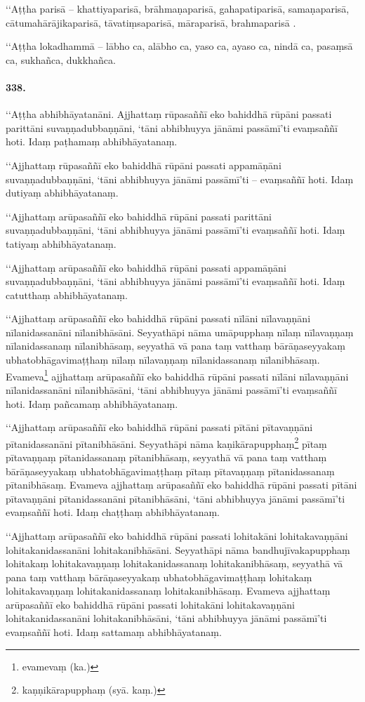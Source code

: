 ‘‘Aṭṭha parisā – khattiyaparisā, brāhmaṇaparisā, gahapatiparisā, samaṇaparisā, cātumahārājikaparisā, tāvatiṃsaparisā, māraparisā, brahmaparisā .

‘‘Aṭṭha lokadhammā – lābho ca, alābho ca, yaso ca, ayaso ca, nindā ca, pasaṃsā ca, sukhañca, dukkhañca.

\paragraph{338.} ‘‘Aṭṭha abhibhāyatanāni. Ajjhattaṃ rūpasaññī eko bahiddhā rūpāni passati parittāni suvaṇṇadubbaṇṇāni, ‘tāni abhibhuyya jānāmi passāmī’ti evaṃsaññī hoti. Idaṃ paṭhamaṃ abhibhāyatanaṃ.

‘‘Ajjhattaṃ rūpasaññī eko bahiddhā rūpāni passati appamāṇāni suvaṇṇadubbaṇṇāni, ‘tāni abhibhuyya jānāmi passāmī’ti – evaṃsaññī hoti. Idaṃ dutiyaṃ abhibhāyatanaṃ.

‘‘Ajjhattaṃ arūpasaññī eko bahiddhā rūpāni passati parittāni suvaṇṇadubbaṇṇāni, ‘tāni abhibhuyya jānāmi passāmī’ti evaṃsaññī hoti. Idaṃ tatiyaṃ abhibhāyatanaṃ.

‘‘Ajjhattaṃ arūpasaññī eko bahiddhā rūpāni passati appamāṇāni suvaṇṇadubbaṇṇāni, ‘tāni abhibhuyya jānāmi passāmī’ti evaṃsaññī hoti. Idaṃ catutthaṃ abhibhāyatanaṃ.

‘‘Ajjhattaṃ arūpasaññī eko bahiddhā rūpāni passati nīlāni nīlavaṇṇāni nīlanidassanāni nīlanibhāsāni. Seyyathāpi nāma umāpupphaṃ nīlaṃ nīlavaṇṇaṃ nīlanidassanaṃ nīlanibhāsaṃ, seyyathā vā pana taṃ vatthaṃ bārāṇaseyyakaṃ ubhatobhāgavimaṭṭhaṃ nīlaṃ nīlavaṇṇaṃ nīlanidassanaṃ nīlanibhāsaṃ. Evameva\footnote{evamevaṃ (ka.)} ajjhattaṃ arūpasaññī eko bahiddhā rūpāni passati nīlāni nīlavaṇṇāni nīlanidassanāni nīlanibhāsāni, ‘tāni abhibhuyya jānāmi passāmī’ti evaṃsaññī hoti. Idaṃ pañcamaṃ abhibhāyatanaṃ.

‘‘Ajjhattaṃ arūpasaññī eko bahiddhā rūpāni passati pītāni pītavaṇṇāni pītanidassanāni pītanibhāsāni. Seyyathāpi nāma kaṇikārapupphaṃ\footnote{kaṇṇikārapupphaṃ (syā. kaṃ.)} pītaṃ pītavaṇṇaṃ pītanidassanaṃ pītanibhāsaṃ, seyyathā vā pana taṃ vatthaṃ bārāṇaseyyakaṃ ubhatobhāgavimaṭṭhaṃ pītaṃ pītavaṇṇaṃ pītanidassanaṃ pītanibhāsaṃ. Evameva ajjhattaṃ arūpasaññī eko bahiddhā rūpāni passati pītāni pītavaṇṇāni pītanidassanāni pītanibhāsāni, ‘tāni abhibhuyya jānāmi passāmī’ti evaṃsaññī hoti. Idaṃ chaṭṭhaṃ abhibhāyatanaṃ.

‘‘Ajjhattaṃ arūpasaññī eko bahiddhā rūpāni passati lohitakāni lohitakavaṇṇāni lohitakanidassanāni lohitakanibhāsāni. Seyyathāpi nāma bandhujīvakapupphaṃ lohitakaṃ lohitakavaṇṇaṃ lohitakanidassanaṃ lohitakanibhāsaṃ, seyyathā vā pana taṃ vatthaṃ bārāṇaseyyakaṃ ubhatobhāgavimaṭṭhaṃ lohitakaṃ lohitakavaṇṇaṃ lohitakanidassanaṃ lohitakanibhāsaṃ. Evameva ajjhattaṃ arūpasaññī eko bahiddhā rūpāni passati lohitakāni lohitakavaṇṇāni lohitakanidassanāni lohitakanibhāsāni, ‘tāni abhibhuyya jānāmi passāmī’ti evaṃsaññī hoti. Idaṃ sattamaṃ abhibhāyatanaṃ.

